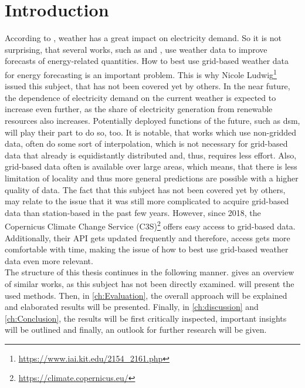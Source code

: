 \chapter{Introduction}
\label{ch:Introduction}

According to , weather has a great impact on electricity demand. So it is not surprising, that several works, such as  and , use weather data to improve forecasts of energy-related quantities. How to best use grid-based weather data for energy forecasting is an important problem. This is why Nicole Ludwig\footnote{\url{https://www.iai.kit.edu/2154_2161.php}} issued this subject, that has not been covered yet by others. In the near future, the dependence of electricity demand on the current weather is expected to increase even further, as the share of electricity generation from renewable resources also increases. Potentially deployed functions of the future, such as \gls{dsm}, will play their part to do so, too. It is notable, that works which use non-gridded data, often do some sort of interpolation, which is not necessary for grid-based data that already is equidistantly distributed and, thus, requires less effort. Also, grid-based data often is available over large areas, which means, that there is less limitation of locality and thus more general predictions are possible with a higher quality of data. The fact that this subject has not been covered yet by others, may relate to the issue that it was still more complicated to acquire grid-based data than station-based in the past few years. However, since 2018, the Copernicus Climate Change Service (C3S)\footnote{\url{https://climate.copernicus.eu/}} offers easy access to grid-based data. Additionally, their API gets updated frequently and therefore, access gets more comfortable with time, making the issue of how to best use grid-based weather data even more relevant.\\

The structure of this thesis continues in the following manner.  gives an overview of similar works, as this subject has not been directly examined.  will present the used methods. Then, in \cref{ch:Evaluation}, the overall approach will be explained and elaborated results will be presented. Finally, in \cref{ch:discussion} and \cref{ch:Conclusion}, the results will be first critically inspected, important insights will be outlined and finally, an outlook for further research will be given.\\

